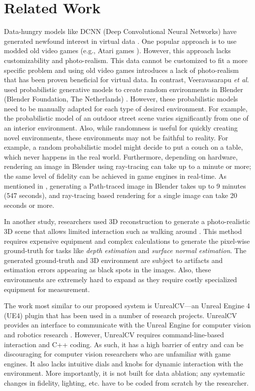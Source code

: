 \documentclass[runningheads]{llncs}
\begin{document}
\section{Related Work}
\label{sec:relatedWork}
Data-hungry models like DCNN (Deep Convolutional Neural Networks) have generated newfound interest in virtual data \cite{Photorealism2,photorealism3,datafromgames}. One popular approach is to use modded old video games (e.g., Atari games \cite{2013arXiv1312.5602M}). However, this approach lacks customizability and photo-realism. This data cannot be customized to fit a more specific problem and using old video games introduces a lack of photo-realism that has been proven beneficial for virtual data\cite{7926706_photo_realism, 2019arXiv190108644M}. In contrast, Veeravasarapu \textit{et al.} \cite{7926706_photo_realism} used probabilistic generative models to create random environments in Blender (Blender Foundation, The Netherlands) \cite{blender}. However, these probabilistic models need to be manually adapted for each type of desired environment. For example, the probabilistic model of an outdoor street scene varies significantly from one of an interior environment. Also, while randomness is useful for quickly creating novel environments, these environments may not be faithful to reality. For example, a random probabilistic model might decide to put a couch on a table, which never happens in the real world. Furthermore, depending on hardware, rendering an image in Blender using ray-tracing can take up to a minute or more; the same level of fidelity can be achieved in game engines in real-time. As mentioned in \cite{7926706_photo_realism}, generating a Path-traced image in Blender takes up to 9 minutes (547 seconds), and ray-tracing based rendering for a single image can take 20 seconds or more.

In another study, researchers used 3D reconstruction to generate a photo-realistic 3D scene that allows limited interaction such as walking around \cite{habitat19iccv}. This method requires expensive equipment and complex calculations to generate the pixel-wise ground-truth for tasks like \textit{depth estimation} and \textit{surface normal estimation}. The generated ground-truth and 3D environment are subject to artifacts and estimation errors appearing as black spots in the images. Also, these environments are extremely hard to expand as they require costly specialized equipment for measurement. 



The work most similar to our proposed system is UnrealCV---an Unreal Engine 4 (UE4) plugin that has been used in a number of research projects. UnrealCV provides an interface to communicate with the Unreal Engine for computer vision and robotics research \cite{qiu2017unrealcv}. However, UnrealCV requires command-line-based interaction and C++ coding. As such, it has a high barrier of entry and can be discouraging for computer vision researchers who are unfamiliar with game engines. It also lacks intuitive dials and knobs for dynamic interaction with the environment. More importantly, it is not built for data ablation; any systematic changes in fidelity, lighting, etc. have to be coded from scratch by the researcher.        
\end{document}
